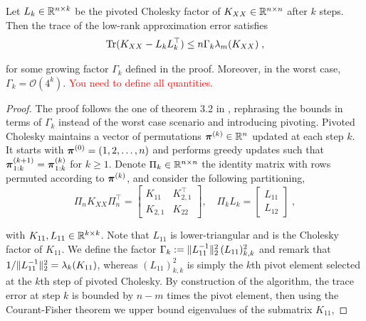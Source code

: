 \documentclass{article}
\begin{document}
{\begin{theorem} \label{thm:pivchol_decay}

Let $L_k \in \mathbb R^{n\times k}$ be the pivoted Cholesky factor of $K_{XX} \in \mathbb R^{n\times n}$ after $k$ steps. Then the trace of the low-rank approximation error satisfies
\begin{equation}
    \operatorname{Tr}(K_{XX} - L_kL_k^\top) \le n \Gamma_k \lambda_m(K_{XX}) \;,
\end{equation}

for some growing factor $\Gamma_k$ defined in the proof. Moreover, in the worst case, $\Gamma_k = \mathcal O(4^k)$. \textcolor{red}{You need to define all quantities. }
\end{theorem}
\begin{proof}
The proof follows the one of theorem 3.2 in \cite{harbrecht_low-rank_2012}, rephrasing the bounds in terms of $\Gamma_k$ instead of the worst case scenario and introducing pivoting.
Pivoted Cholesky maintains a vector of permutations $\boldsymbol{\mathbf{\pi}}^{(k)} \in \mathbb R^n$ updated at each step $k$. It starts with $\boldsymbol{\mathbf{\pi}}^{(0)} = (1, 2, \ldots, n)$ and performs greedy updates such that $\boldsymbol{\mathbf{\pi}}^{(k+1)}_{1:k} = \boldsymbol{\mathbf{\pi}}^{(k)}_{1:k}$ for $k\ge 1$. Denote $\Pi_k \in \mathbb R^{n\times n}$ the identity matrix with rows permuted according to $\boldsymbol{\mathbf{\pi}}^{(k)}$, and consider the following partitioning,
\begin{equation*}
    \Pi_n K_{XX} \Pi_n^\top = \begin{bmatrix}
    K_{11} & K_{2,1}^\top \\ K_{2,1} & K_{22}
    \end{bmatrix}, \quad
    \Pi_k L_k = \begin{bmatrix}
    L_{11} \\ L_{12}
    \end{bmatrix} \; ,
\end{equation*}

with $K_{11}, L_{11} \in \mathbb R^{k\times k}$. Note that $L_{11}$ is lower-triangular and is the Cholesky factor of $K_{11}$.
We define the factor $\Gamma_k := \Vert L_{11}^{-1} \Vert_2^2 \, (L_{11})_{k, k}^2$ and remark that $1/\Vert L_{11}^{-1} \Vert_2^2 = \lambda_k(K_{11})$, whereas $(L_{11})_{k, k}^2$ is simply the $k$th pivot element selected at the $k$th step of pivoted Cholesky.
By construction of the algorithm, the trace error at step $k$ is bounded by $n-m$ times the pivot element, then using the Courant-Fisher theorem we upper bound eigenvalues of the submatrix $K_{11}$,


\end{proof}}
\end{document}
